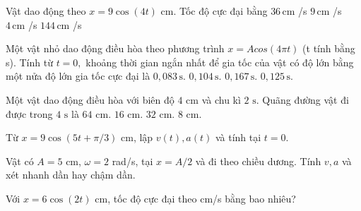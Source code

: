 \begin{ex}
Vật dao động theo $x=9\cos(4t)$ cm. Tốc độ cực đại bằng
\choice
{\True $36\,\text{cm}$ /s}
{$9\,\text{cm}$ /s}
{$4\,\text{cm}$ /s}
{$144\,\text{cm}$ /s}
\end{ex}

\begin{ex}
Một vật nhỏ dao động điều hòa theo phương trình $x=Acos\left( 4\pi t \right)$ (t tính bằng s). Tính từ $t=0,$ khoảng thời gian ngắn nhất để gia tốc của vật có độ lớn bằng một nửa độ lớn gia tốc cực đại là
\choice
{\True $0,083\,\text{s}$.}
{$0,104\,\text{s}$.}
{$0,167\,\text{s}$.}
{$0,125\,\text{s}$.}
\end{ex}

\begin{ex}
Một vật dao động điều hòa với biên độ $\text{4 cm}$ và chu kì $\text{2 s}\text{.}$ Quãng đường vật đi được trong $\text{4 s}$ là
\choice
{$\text{64 cm}\text{.}$}
{$\text{16 cm}\text{.}$}
{\True $\text{32 cm}\text{.}$}
{$\text{8 cm}\text{.}$}
\end{ex}

\begin{ex}
Từ $x=9\cos(5t+\pi/3)$ cm, lập $v(t),a(t)$ và tính tại $t=0$.
\choiceTF

\end{ex}

\begin{ex}
Vật có $A=5$ cm, $\omega=2$ rad/s, tại $x=A/2$ và đi theo chiều dương. Tính $v,a$ và xét nhanh dần hay chậm dần.
\choiceTF

\end{ex}

\begin{ex}
Với $x=6\cos(2t)$ cm, tốc độ cực đại theo cm/s bằng bao nhiêu?
\end{ex}

